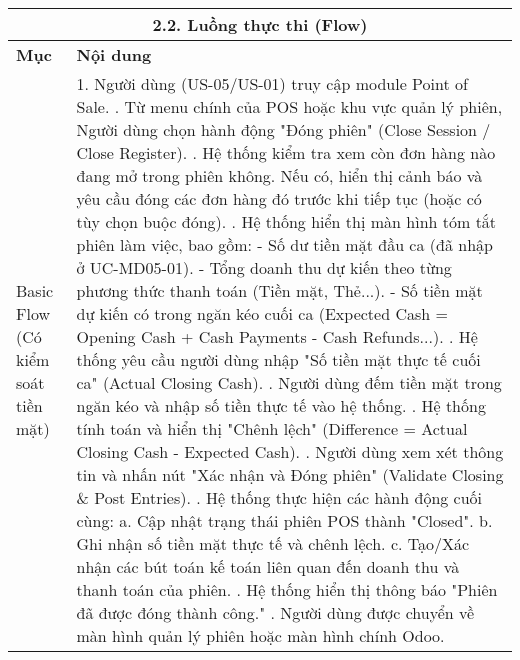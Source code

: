 \begin{longtable}{|m{4cm}|p{11cm}|}
\hline
\multicolumn{2}{|c|}{\textbf{2.2. Luồng thực thi (Flow)}} \\
\hline
\textbf{Mục} & \textbf{Nội dung} \\
\hline
Basic Flow (Có kiểm soát tiền mặt) & 1. Người dùng (US-05/US-01) truy cập module Point of Sale. \newline 2. Từ menu chính của POS hoặc khu vực quản lý phiên, Người dùng chọn hành động "Đóng phiên" (Close Session / Close Register). \newline 3. Hệ thống kiểm tra xem còn đơn hàng nào đang mở trong phiên không. Nếu có, hiển thị cảnh báo và yêu cầu đóng các đơn hàng đó trước khi tiếp tục (hoặc có tùy chọn buộc đóng). \newline 4. Hệ thống hiển thị màn hình tóm tắt phiên làm việc, bao gồm: \newline    - Số dư tiền mặt đầu ca (đã nhập ở UC-MD05-01). \newline    - Tổng doanh thu dự kiến theo từng phương thức thanh toán (Tiền mặt, Thẻ...). \newline    - Số tiền mặt dự kiến có trong ngăn kéo cuối ca (Expected Cash = Opening Cash + Cash Payments - Cash Refunds...). \newline 5. Hệ thống yêu cầu người dùng nhập "Số tiền mặt thực tế cuối ca" (Actual Closing Cash). \newline 6. Người dùng đếm tiền mặt trong ngăn kéo và nhập số tiền thực tế vào hệ thống. \newline 7. Hệ thống tính toán và hiển thị "Chênh lệch" (Difference = Actual Closing Cash - Expected Cash). \newline 8. Người dùng xem xét thông tin và nhấn nút "Xác nhận và Đóng phiên" (Validate Closing \& Post Entries). \newline 9. Hệ thống thực hiện các hành động cuối cùng: \newline    a. Cập nhật trạng thái phiên POS thành "Closed". \newline    b. Ghi nhận số tiền mặt thực tế và chênh lệch. \newline    c. Tạo/Xác nhận các bút toán kế toán liên quan đến doanh thu và thanh toán của phiên. \newline 10. Hệ thống hiển thị thông báo "Phiên đã được đóng thành công." \newline 11. Người dùng được chuyển về màn hình quản lý phiên hoặc màn hình chính Odoo. \\
\hline

\end{longtable}
